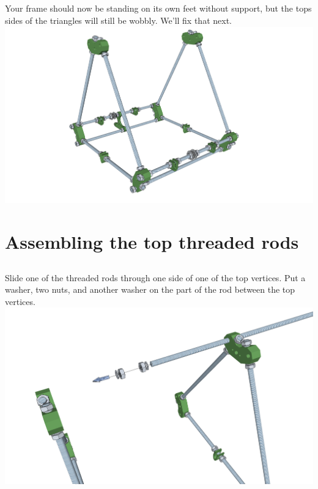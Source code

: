 \documentclass[twoside,openany,a4paper,titlepage]{memoir}
\begin{document}
	\section{}
	Your frame should now be standing on its own feet without support, but the tops sides of the triangles
	will still be wobbly. We'll fix that next.\\
	\includegraphics[width=1\linewidth]{graphics/ch3_5.png}
	
	\chapter{Assembling the top threaded rods}
	
	\section{}
	Slide one of the threaded rods through one side of one of the top vertices. Put a washer, two nuts, and
	another washer on the part of the rod between the top vertices.\\
	\includegraphics[width=1\linewidth]{graphics/ch4_1.png}
	
\end{document}
